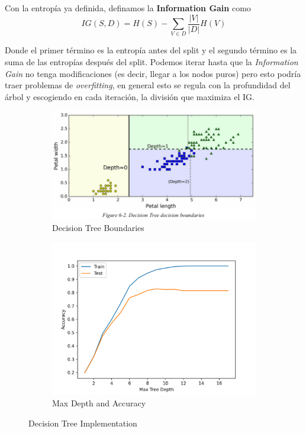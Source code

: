 Con la entropía ya definida, definamos la \textbf{Information Gain} como 
$$IG(S,D) = H(S) - \sum_{V \in D}\frac{|V|}{|D|}H(V)$$

Donde el primer término es la entropía antes del split y el segundo término es la suma de las entropías después del split. Podemos iterar hasta que la \textit{Information Gain} no tenga modificaciones (es decir, llegar a los nodos puros) pero esto podría traer problemas de \textit{overfitting}, en general esto se regula con la profundidad del árbol y escogiendo en cada iteración, la división que maximiza el IG. 

\begin{figure}[H]
\begin{subfigure}{.5\textwidth}
    \center
    \includegraphics[scale=0.3]{notebooks/ML/img/decision_tree_data.png}
    \caption{Decision Tree Boundaries}
\end{subfigure}%
\begin{subfigure}{.5\textwidth}
    \center
    \includegraphics[scale=0.4]{notebooks/ML/img/max_depth_decision_tree.png}
    \caption{Max Depth and Accuracy}
\end{subfigure}
\caption{Decision Tree Implementation}
\label{fig:fig}
\end{figure}

